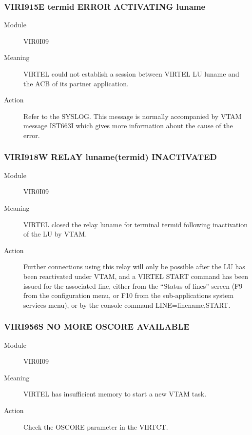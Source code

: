 \documentclass[letterpaper,10pt,english]{sphinxmanual}
\begin{document}
\subsubsection{VIRI915E termid ERROR ACTIVATING luname}
\label{\detokenize{messages:viri915e-termid-error-activating-luname}}\begin{description}
\item[{Module}] \leavevmode
VIR0I09

\item[{Meaning}] \leavevmode
VIRTEL could not establish a session between VIRTEL LU luname and the ACB of its partner application.

\item[{Action}] \leavevmode
Refer to the SYSLOG. This message is normally accompanied by VTAM message IST663I which gives more information about the cause of the error.

\end{description}


\subsubsection{VIRI918W RELAY luname(termid) INACTIVATED}
\label{\detokenize{messages:viri918w-relay-luname-termid-inactivated}}\begin{description}
\item[{Module}] \leavevmode
VIR0I09

\item[{Meaning}] \leavevmode
VIRTEL closed the relay luname for terminal termid following inactivation of the LU by VTAM.

\item[{Action}] \leavevmode
Further connections using this relay will only be possible after the LU has been reactivated under VTAM, and a VIRTEL START command has been issued for the associated line, either from the “Status of lines” screen (F9 from the configuration menu, or F10 from the sub-applications system services menu), or by the console command LINE=linename,START.

\end{description}


\subsubsection{VIRI956S NO MORE OSCORE AVAILABLE}
\label{\detokenize{messages:viri956s-no-more-oscore-available}}\begin{description}
\item[{Module}] \leavevmode
VIR0I09

\item[{Meaning}] \leavevmode
VIRTEL has insufficient memory to start a new VTAM task.

\item[{Action}] \leavevmode
Check the OSCORE parameter in the VIRTCT.

\end{description}
\end{document}
